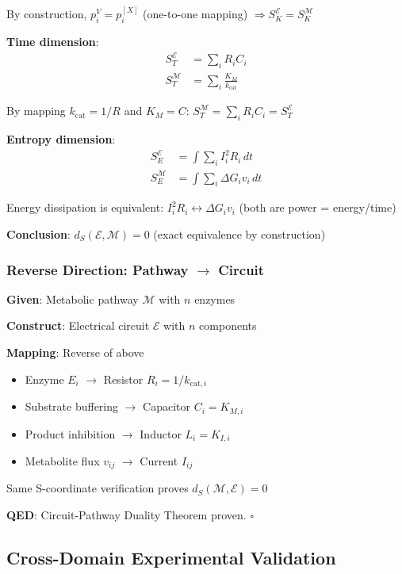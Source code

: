 \documentclass[11pt,a4paper]{article}
\begin{document}
By construction, $p_i^V = p_i^{[X]}$ (one-to-one mapping) $\Rightarrow S_K^{\mathcal{E}} = S_K^{\mathcal{M}}$

\textbf{Time dimension}:
\begin{align}
S_T^{\mathcal{E}} &= \sum_i R_i C_i \\
S_T^{\mathcal{M}} &= \sum_i \frac{K_M}{k_{\text{cat}}}
\end{align}

By mapping $k_{\text{cat}} = 1/R$ and $K_M = C$: $S_T^{\mathcal{M}} = \sum_i R_i C_i = S_T^{\mathcal{E}}$

\textbf{Entropy dimension}:
\begin{align}
S_E^{\mathcal{E}} &= \int \sum_i I_i^2 R_i \, dt \\
S_E^{\mathcal{M}} &= \int \sum_i \Delta G_i v_i \, dt
\end{align}

Energy dissipation is equivalent: $I_i^2 R_i \leftrightarrow \Delta G_i v_i$ (both are power = energy/time)

\textbf{Conclusion}: $d_S(\mathcal{E}, \mathcal{M}) = 0$ (exact equivalence by construction)

\subsubsection{Reverse Direction: Pathway $\to$ Circuit}

\textbf{Given}: Metabolic pathway $\mathcal{M}$ with $n$ enzymes

\textbf{Construct}: Electrical circuit $\mathcal{E}$ with $n$ components

\textbf{Mapping}: Reverse of above
\begin{itemize}
\item Enzyme $E_i$ $\to$ Resistor $R_i = 1/k_{\text{cat},i}$
\item Substrate buffering $\to$ Capacitor $C_i = K_{M,i}$
\item Product inhibition $\to$ Inductor $L_i = K_{I,i}$
\item Metabolite flux $v_{ij}$ $\to$ Current $I_{ij}$
\end{itemize}

Same S-coordinate verification proves $d_S(\mathcal{M}, \mathcal{E}) = 0$

\textbf{QED}: Circuit-Pathway Duality Theorem proven. $\square$

\subsection{Cross-Domain Experimental Validation}
\end{document}
